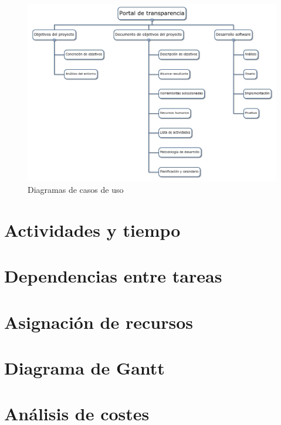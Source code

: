 \begin{figure}[h]
\caption{Diagramas de casos de uso}
\centering
\includegraphics[width=1.1\textwidth]{imagenes/edt.png}
\end{figure}

\section{Actividades y tiempo}

\section{Dependencias entre tareas}

\section{Asignación de recursos}

\section{Diagrama de Gantt}

\section{Análisis de costes}
